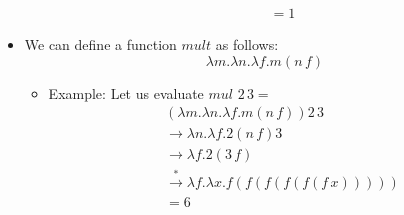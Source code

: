 \documentclass[]{article}
\begin{document}
\begin{itemize}
\begin{itemize}
\begin{align*}
&= 1
\end{align*}
\end{itemize}
\item We can define a function $mult$ as follows:
\[ \lambda m.\lambda n.\lambda f.m(n\,f) \]
\begin{itemize}
\item Example: Let us evaluate $mul\,\,2\,3=$
\begin{align*}
&(\lambda m.\lambda n.\lambda f.m(n\,f))2\,3 \\
&\rightarrow \lambda n.\lambda f.2(n\,f)3 \\
&\rightarrow \lambda f.2(3\,f) \\
&\overset{*}{\rightarrow}\lambda f.\lambda x.f(f(f(f(f(f\,x))))) \\
&= 6
\end{align*}
\end{itemize}
\end{itemize}
\end{document}
